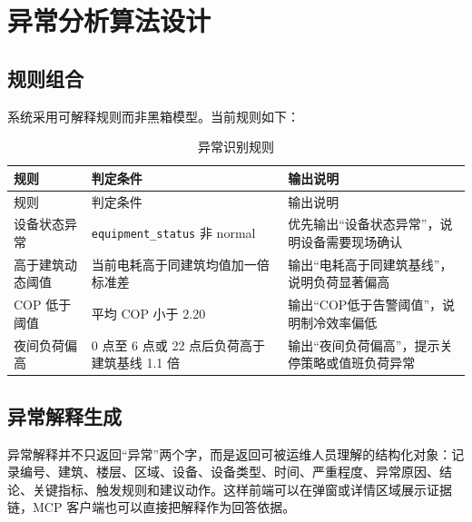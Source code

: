 \documentclass[12pt,a4paper]{ctexart}
\newcommand{\code}[1]{{\footnotesize\nolinkurl{#1}}}
\begin{document}
\section{异常分析算法设计}
\subsection{规则组合}
系统采用可解释规则而非黑箱模型。当前规则如下：
\begin{longtable}{p{3.2cm}p{5.2cm}p{5.5cm}}
\caption{异常识别规则}\\
\toprule
规则 & 判定条件 & 输出说明 \\
\midrule
\endfirsthead
\toprule
规则 & 判定条件 & 输出说明 \\
\midrule
\endhead
设备状态异常 & \code{equipment_status} 非 normal & 优先输出“设备状态异常”，说明设备需要现场确认 \\
高于建筑动态阈值 & 当前电耗高于同建筑均值加一倍标准差 & 输出“电耗高于同建筑基线”，说明负荷显著偏高 \\
COP 低于阈值 & 平均 COP 小于 2.20 & 输出“COP低于告警阈值”，说明制冷效率偏低 \\
夜间负荷偏高 & 0 点至 6 点或 22 点后负荷高于建筑基线 1.1 倍 & 输出“夜间负荷偏高”，提示关停策略或值班负荷异常 \\
\bottomrule
\end{longtable}

\subsection{异常解释生成}
异常解释并不只返回“异常”两个字，而是返回可被运维人员理解的结构化对象：记录编号、建筑、楼层、区域、设备、设备类型、时间、严重程度、异常原因、结论、关键指标、触发规则和建议动作。这样前端可以在弹窗或详情区域展示证据链，MCP 客户端也可以直接把解释作为回答依据。
\end{document}
